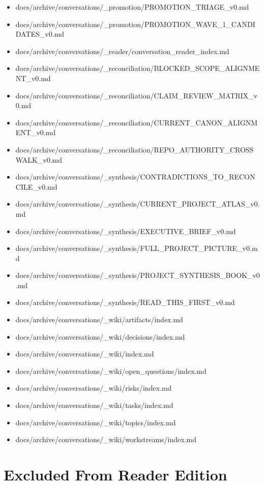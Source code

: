 \documentclass[11pt,a4paper]{report}
\begin{document}
\begin{itemize}
\item docs/archive/conversations/\_promotion/PROMOTION\_TRIAGE\_v0.md
\item docs/archive/conversations/\_promotion/PROMOTION\_WAVE\_1\_CANDIDATES\_v0.md
\item docs/archive/conversations/\_reader/conversation\_reader\_index.md
\item docs/archive/conversations/\_reconciliation/BLOCKED\_SCOPE\_ALIGNMENT\_v0.md
\item docs/archive/conversations/\_reconciliation/CLAIM\_REVIEW\_MATRIX\_v0.md
\item docs/archive/conversations/\_reconciliation/CURRENT\_CANON\_ALIGNMENT\_v0.md
\item docs/archive/conversations/\_reconciliation/REPO\_AUTHORITY\_CROSSWALK\_v0.md
\item docs/archive/conversations/\_synthesis/CONTRADICTIONS\_TO\_RECONCILE\_v0.md
\item docs/archive/conversations/\_synthesis/CURRENT\_PROJECT\_ATLAS\_v0.md
\item docs/archive/conversations/\_synthesis/EXECUTIVE\_BRIEF\_v0.md
\item docs/archive/conversations/\_synthesis/FULL\_PROJECT\_PICTURE\_v0.md
\item docs/archive/conversations/\_synthesis/PROJECT\_SYNTHESIS\_BOOK\_v0.md
\item docs/archive/conversations/\_synthesis/READ\_THIS\_FIRST\_v0.md
\item docs/archive/conversations/\_wiki/artifacts/index.md
\item docs/archive/conversations/\_wiki/decisions/index.md
\item docs/archive/conversations/\_wiki/index.md
\item docs/archive/conversations/\_wiki/open\_questions/index.md
\item docs/archive/conversations/\_wiki/risks/index.md
\item docs/archive/conversations/\_wiki/tasks/index.md
\item docs/archive/conversations/\_wiki/topics/index.md
\item docs/archive/conversations/\_wiki/workstreams/index.md
\end{itemize}

\section{Excluded From Reader Edition}
\end{document}
